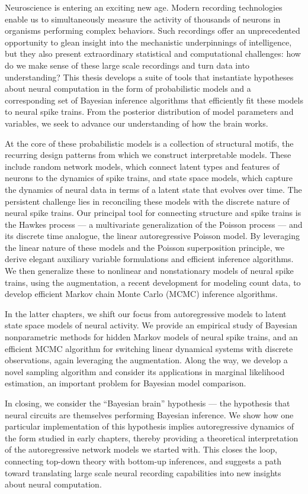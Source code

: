 Neuroscience is entering an exciting new age.  Modern recording
technologies enable us to simultaneously measure the activity of
thousands of neurons in organisms performing complex behaviors.  Such
recordings offer an unprecedented opportunity to glean insight into
the mechanistic underpinnings of intelligence, but they also present
extraordinary statistical and computational challenges: how do we make
sense of these large scale recordings and turn data into
understanding? This thesis develops a suite of tools that instantiate
hypotheses about neural computation in the form of
probabilistic models and a corresponding set of Bayesian inference
algorithms that efficiently fit these models to neural spike trains.
From the posterior distribution of model parameters and variables,
we seek to advance our understanding of how the brain works. 

At the core of these probabilistic models is a collection of
structural motifs, the recurring design patterns from which we
construct interpretable models. These include random network models,
which connect latent types and features of neurons to the dynamics of
spike trains, and state space models, which capture the dynamics of
neural data in terms of a latent state that evolves over time.  The
persistent challenge lies in reconciling these models with the
discrete nature of neural spike trains.  Our principal tool for
connecting structure and spike trains is the Hawkes process --- a
multivariate generalization of the Poisson process --- and its
discrete time analogue, the linear autoregressive Poisson model.  By
leveraging the linear nature of these models and the Poisson
superposition principle, we derive elegant auxiliary variable
formulations and efficient inference algorithms. We then generalize
these to nonlinear and nonstationary models of neural spike trains, 
using the \polyagamma augmentation, a recent development for modeling
count data, to develop efficient Markov chain Monte Carlo (MCMC)
inference algorithms.

In the latter chapters, we shift our focus from autoregressive models
to latent state space models of neural activity. We provide an
empirical study of Bayesian nonparametric methods for hidden Markov
models of neural spike trains, and an efficient MCMC algorithm for
switching linear dynamical systems with discrete observations, again
leveraging the \polyagamma augmentation. Along the way, we develop
a novel \polyagamma sampling algorithm and consider its applications in
marginal likelihood estimation, an important problem for Bayesian
model comparison.

In closing, we consider the ``Bayesian brain'' hypothesis --- the
hypothesis that neural circuits are themselves performing Bayesian
inference.  We show how one particular implementation of this
hypothesis implies autoregressive dynamics of the form studied
in early chapters, thereby providing a theoretical interpretation of
the autoregressive network models we started with.  This closes the
loop, connecting top-down theory with bottom-up inferences, and
suggests a path toward translating large scale neural recording
capabilities into new insights about neural computation.


